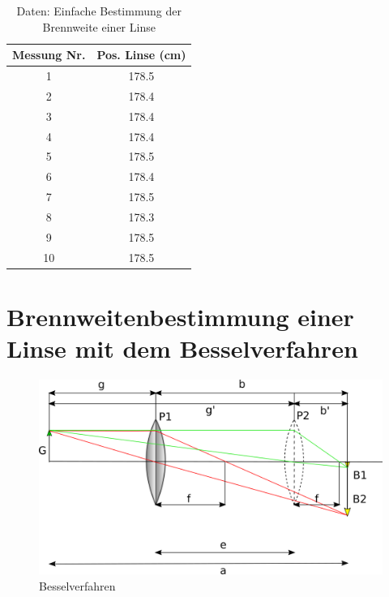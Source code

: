 \begin{table}[h!]
    \centering
    \begin{tabular}{|c|c|}
    	\hline
    	Messung Nr. & Pos. Linse (cm) \\
    	\hline
    	1 & 178.5 \\
    	\hline
    	2 & 178.4 \\
    	\hline
    	3 & 178.4 \\
    	\hline
    	4 & 178.4 \\
    	\hline
    	5 & 178.5 \\
    	\hline
    	6 & 178.4 \\
    	\hline
    	7 & 178.5 \\
    	\hline
    	8 & 178.3 \\
    	\hline
    	9 & 178.5 \\
    	\hline
    	10 & 178.5 \\
    	\hline
    
    \end{tabular}
    \caption{Daten: Einfache Bestimmung der Brennweite einer Linse}
    \label{tab:Daten1}
\end{table}

\section{Brennweitenbestimmung einer Linse mit dem Besselverfahren}

\begin{figure}[h]
    \centering
    \includegraphics{Geometrische_Optik/Protokoll/fig/Besselverfahren.png}
    \caption{Besselverfahren}
    \label{fig:Besselverfahren}
\end{figure}

